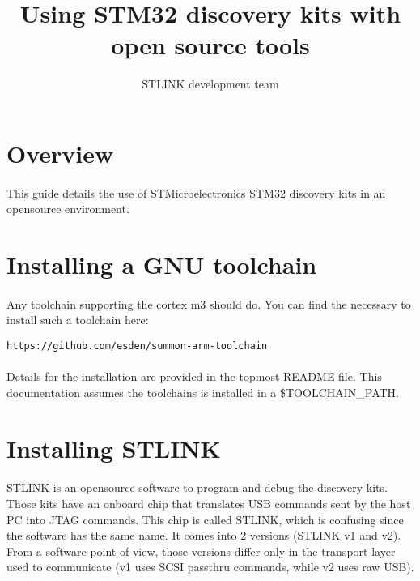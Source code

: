 \documentclass[a4paper, 11pt]{article}
\begin{document}
\title{Using STM32 discovery kits with open source tools}
\author{STLINK development team}
\date{}

\maketitle

\newpage
\tableofcontents
{}


\newpage

\section{Overview}
\paragraph{}
This guide details the use of STMicroelectronics STM32 discovery kits in
an opensource environment.


\newpage

\section{Installing a GNU toolchain}
\paragraph{}
Any toolchain supporting the cortex m3 should do. You can find the necessary
to install such a toolchain here:\\
\begin{small}
\begin{lstlisting}[frame=tb]
https://github.com/esden/summon-arm-toolchain
\end{lstlisting}
\end{small}

\paragraph{}
Details for the installation are provided in the topmost README file.
This documentation assumes the toolchains is installed in a \$TOOLCHAIN\_PATH.


\newpage

\section{Installing STLINK}
\paragraph{}
STLINK is an opensource software to program and debug the discovery kits. Those
kits have an onboard chip that translates USB commands sent by the host PC into
JTAG commands. This chip is called STLINK, which is confusing since the software
has the same name. It comes into 2 versions (STLINK v1 and v2). From a software
point of view, those versions differ only in the transport layer used to communicate
(v1 uses SCSI passthru commands, while v2 uses raw USB).
\end{document}
